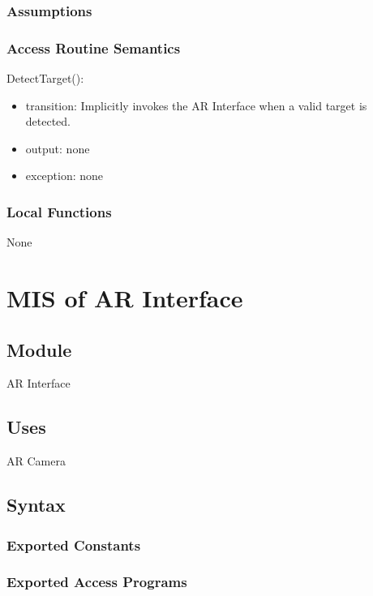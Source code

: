 \documentclass[12pt, titlepage]{article}
\begin{document}
\subsubsection{Assumptions}

\subsubsection{Access Routine Semantics}

\noindent DetectTarget():
\begin{itemize}
\item transition: Implicitly invokes the AR Interface when a valid target is detected.
\item output: none
\item exception: none
\end{itemize}

\subsubsection{Local Functions}

None

\newpage

\section{MIS of AR Interface} \label{mARInterface}

\subsection{Module}

AR Interface

\subsection{Uses}

AR Camera

\subsection{Syntax}

\subsubsection{Exported Constants}

\subsubsection{Exported Access Programs}
\end{document}
